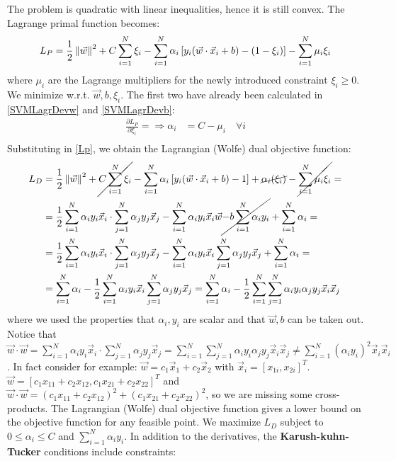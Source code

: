 The problem is quadratic with linear inequalities, hence it is still convex. The Lagrange primal function becomes:
\begin{equation}
L_P = \frac{1}{2}\norm{ \vec{w}}^2 + C \sum_{i=1}^N \xi_i - \sum_{i=1}^N \alpha_i \left[y_i\br{
\vec{w} \cdot \vec{x}_i+b}-\br{1-\xi_i}\right] - \sum_{i=1}^N \mu_i \xi_i 
\label{Lp}
\end{equation}
where $\mu_i$ are the Lagrange multipliers for the newly introduced constraint $\xi_i\ge 0$.
We minimize w.r.t. $\vec{w}, b, \xi_i$. The first two have already been calculated in \autoref{SVMLagrDevw} and \autoref{SVMLagrDevb}:
\begin{equation}
\begin{aligned}
\frac{\partial L_P}{\partial \xi_i} = \Rightarrow \alpha_i &= C - \mu_i \quad \forall i\\
\end{aligned}
\end{equation}
Substituting in \autoref{Lp}, we obtain the Lagrangian (Wolfe) dual objective function:
\begin{equation}
\begin{aligned}
L_D &=  \frac{1}{2}\norm{ \vec{w}}^2 + \cancel{C \sum_{i=1}^N \xi_i} - \sum_{i=1}^N \alpha_i \left[y_i\br{
\vec{w} \cdot \vec{x}_i+b} -1\right]+\cancel{\alpha_i\br{\xi_i}} - \cancel{\sum_{i=1}^N \mu_i \xi_i} = \\
&=\frac{1}{2}\sum_{i=1}^N  \alpha_i y_i \vec{x}_i \cdot \sum_{j=1}^N  \alpha_j y_j \vec{x}_j- \sum_{i=1}^N \alpha_i y_i \vec{x}_i\vec{w} \cancel{- b\sum_{i=1}^N \alpha_i y_i}+ \sum_{i=1}^N \alpha_i =\\
&=\frac{1}{2}\sum_{i=1}^N  \alpha_i y_i \vec{x}_i \cdot \sum_{j=1}^N  \alpha_j y_j \vec{x}_j- \sum_{i=1}^N \alpha_i y_i \vec{x}_i\sum_{j=1}^N \alpha_j y_j \vec{x}_j+ \sum_{i=1}^N \alpha_i =\\
&= \sum_{i=1}^N \alpha_i - \frac{1}{2}\sum_{i=1}^N \alpha_i y_i \vec{x}_i\sum_{j=1}^N \alpha_j y_j \vec{x}_j = \sum_{i=1}^N \alpha_i - \frac{1}{2}\sum_{i=1}^N\sum_{j=1}^N \alpha_i y_i \alpha_j y_j\vec{x}_i  \vec{x}_j
\end{aligned}
\label{LagrangeDueal}
\end{equation}
where we used the properties that $\alpha_i, y_i$ are scalar and that $\vec{w}, b$ can be taken out. Notice that $\vec{w}\cdot \vec{w}  = \sum_{i=1}^N \alpha_i y_i \vec{x}_i\cdot\sum_{j=1}^N\alpha_j y_j \vec{x}_j =\sum_{i=1}^N \sum_{j=1}^N \alpha_i y_i \alpha_j y_j  \vec{x}_i\vec{x}_j \ne \sum_{i=1}^N  (\alpha_i y_i)^2 \vec{x}_i\vec{x}_i$. In fact consider for example: $\vec{w} = c_1\vec{x}_1 + c_2\vec{x}_2$ with $\vec{x}_i = \left[x_{1i}, x_{2i}\right]^T$. $\vec{w} = \left[ c_1x_{11}+c_2x_{12}, c_1x_{21}+c_2x_{22} \right]^T$ and $\vec{w}\cdot \vec{w} = (c_1x_{11}+c_2x_{12})^2+(c_1x_{21}+c_2x_{22})^2$, so we are missing some cross-products. The Lagrangian (Wolfe) dual objective function gives a lower bound on the objective function for any feasible point. We maximize $L_D$ subject to $0\le \alpha_i\le C$ and $\sum_{i=1}^N\alpha_iy_i$. In addition to the derivatives, the \textbf{Karush-kuhn-Tucker} conditions include constraints:
